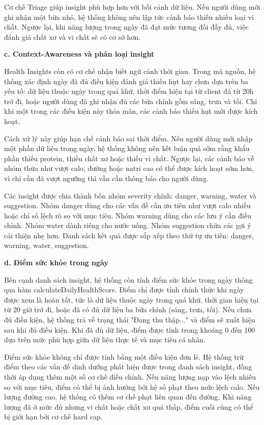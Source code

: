 \documentclass[12pt, a4paper]{report}
\begin{document}
Cơ chế Triage giúp insight phù hợp hơn với bối cảnh dữ liệu. Nếu người dùng mới ghi nhận một bữa nhỏ, hệ thống không nên lập tức cảnh báo thiếu nhiều loại vi chất. Ngược lại, khi năng lượng trong ngày đã đạt mức tương đối đầy đủ, việc đánh giá chất xơ và vi chất sẽ có cơ sở hơn.

\textbf{c. Context-Awareness và phân loại insight}

Health Insights còn có cơ chế nhận biết ngữ cảnh thời gian. Trong mã nguồn, hệ thống xác định ngày đã đủ điều kiện đánh giá thiếu hụt hay chưa dựa trên ba yếu tố: dữ liệu thuộc ngày trong quá khứ, thời điểm hiện tại từ client đã từ 20h trở đi, hoặc người dùng đã ghi nhận đủ các bữa chính gồm sáng, trưa và tối. Chỉ khi một trong các điều kiện này thỏa mãn, các cảnh báo thiếu hụt mới được kích hoạt.

Cách xử lý này giúp hạn chế cảnh báo sai thời điểm. Nếu người dùng mới nhập một phần dữ liệu trong ngày, hệ thống không nên kết luận quá sớm rằng khẩu phần thiếu protein, thiếu chất xơ hoặc thiếu vi chất. Ngược lại, các cảnh báo về nhóm thừa như vượt calo, đường hoặc natri cao có thể được kích hoạt sớm hơn, vì chỉ cần đã vượt ngưỡng thì vẫn cần thông báo cho người dùng.

Các insight được chia thành bốn nhóm severity chính: danger, warning, water và suggestion. Nhóm danger dùng cho các vấn đề cần ưu tiên như vượt calo nhiều hoặc chỉ số lệch rõ so với mục tiêu. Nhóm warning dùng cho các lưu ý cần điều chỉnh. Nhóm water dành riêng cho nước uống. Nhóm suggestion chứa các gợi ý cải thiện nhẹ hơn. Danh sách kết quả được sắp xếp theo thứ tự ưu tiên: danger, warning, water, suggestion.

\textbf{d. Điểm sức khỏe trong ngày}

Bên cạnh danh sách insight, hệ thống còn tính điểm sức khỏe trong ngày thông qua hàm calculateDailyHealthScore. Điểm chỉ được tính chính thức khi ngày được xem là hoàn tất, tức là dữ liệu thuộc ngày trong quá khứ, thời gian hiện tại từ 20 giờ trở đi, hoặc đã có đủ dữ liệu ba bữa chính (sáng, trưa, tối). Nếu chưa đủ điều kiện, hệ thống trả về trạng thái "Đang thu thập..." và điểm sẽ xuất hiện sau khi đủ điều kiện. Khi đã đủ dữ liệu, điểm được tính trong khoảng 0 đến 100 dựa trên mức phù hợp giữa dữ liệu thực tế và mục tiêu cá nhân.

Điểm sức khỏe không chỉ được tính bằng một điều kiện đơn lẻ. Hệ thống trừ điểm theo các vấn đề dinh dưỡng phát hiện được trong danh sách insight, đồng thời áp dụng thêm một số cơ chế điều chỉnh. Nếu năng lượng nạp vào lệch nhiều so với mục tiêu, điểm có thể bị ảnh hưởng bởi hệ số phạt theo mức lệch calo. Nếu lượng đường cao, hệ thống có thêm cơ chế phạt liên quan đến đường. Khi năng lượng đã ở mức đủ nhưng vi chất hoặc chất xơ quá thấp, điểm cuối cùng có thể bị giới hạn bởi cơ chế hard cap.
\end{document}
